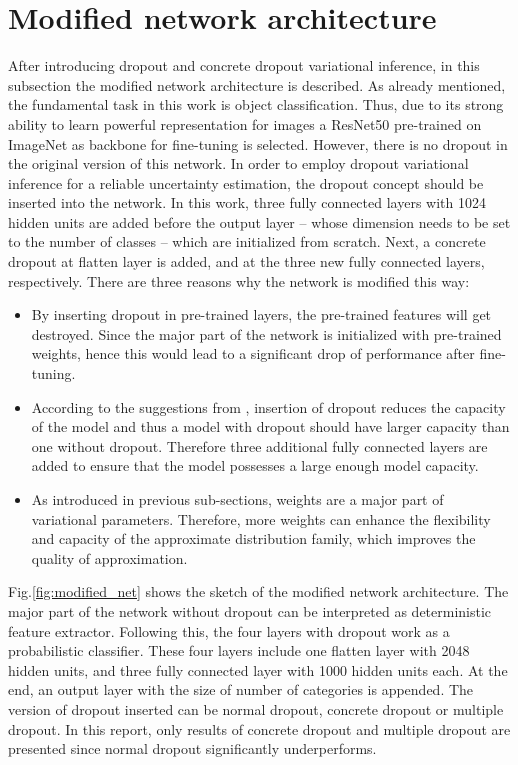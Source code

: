 \section{Modified network architecture}
After introducing dropout and concrete dropout variational inference, in this subsection the modified network architecture is described.
As already mentioned, the fundamental task in this work is object classification.
Thus, due to its strong ability to learn powerful representation for images a ResNet50\cite{he2016deep} pre-trained on ImageNet as backbone for fine-tuning is selected. 
However, there is no dropout in the original version of this network.
In order to employ dropout variational inference for a reliable uncertainty estimation, the dropout concept should be inserted into the network.
In this work, three fully connected layers with 1024 hidden units are added before the output layer -- whose dimension needs to be set to the number of classes -- which are initialized from scratch. 
Next, a concrete dropout at flatten layer is added, and at the three new fully connected layers, respectively.
There are three reasons why the network is modified this way:
\begin{itemize}
	\item By inserting dropout in pre-trained layers, the pre-trained features will get destroyed. Since the major part of the network is initialized with pre-trained weights, hence this would lead to a significant drop of performance after fine-tuning.
	\item According to the suggestions from \cite{srivastava2014dropout}, insertion of dropout reduces the capacity of the model and thus a model with dropout should have larger capacity than one without dropout. Therefore three additional fully connected layers are added to ensure that the model possesses a large enough model capacity.
	\item As introduced in previous sub-sections, weights are a major part of variational parameters. Therefore, more weights can enhance the flexibility and capacity of the approximate distribution family, which improves the quality of approximation.  
\end{itemize}

Fig.\ref{fig:modified_net} shows the sketch of the modified network architecture.
The major part of the network without dropout can be interpreted as deterministic feature extractor.
Following this, the four layers with dropout work as a probabilistic classifier.
These four layers include one flatten layer with 2048 hidden units, and three fully connected layer with 1000 hidden units each.
At the end, an output layer with the size of number of categories is appended.
The version of dropout inserted can be normal dropout, concrete dropout or multiple dropout.
In this report, only results of concrete dropout and multiple dropout are presented since normal dropout significantly underperforms.

